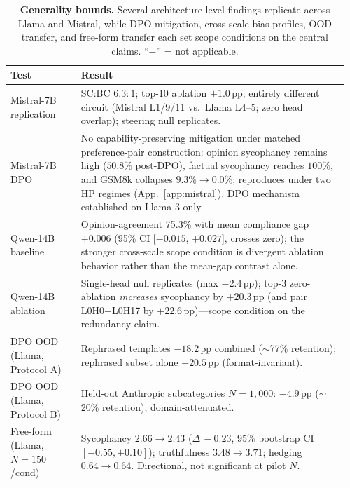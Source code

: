 \documentclass{article}
\begin{document}
\begin{table}[t]
\centering
\caption{\textbf{Generality bounds.} Several architecture-level findings replicate across Llama and Mistral, while DPO mitigation, cross-scale bias profiles, OOD transfer, and free-form transfer each set scope conditions on the central claims. ``$-$'' = not applicable.}
\label{tab:generality}
\footnotesize
\begin{tabular}{@{}>{\raggedright\arraybackslash}p{0.20\linewidth}>{\raggedright\arraybackslash}p{0.76\linewidth}@{}}
\toprule
\textbf{Test} & \textbf{Result} \\
\midrule
Mistral-7B replication & SC:BC $6.3{:}1$; top-10 ablation $+1.0$\,pp; entirely different circuit (Mistral L1/9/11 vs.\ Llama L4--5; zero head overlap); steering null replicates. \\[2pt]
Mistral-7B DPO & No capability-preserving mitigation under matched preference-pair construction: opinion sycophancy remains high ($50.8\%$ post-DPO), factual sycophancy reaches $100\%$, and GSM8k collapses $9.3\% \to 0.0\%$; reproduces under two HP regimes (App.~\ref{app:mistral}). DPO mechanism established on Llama-3 only. \\[2pt]
Qwen-14B baseline & Opinion-agreement 75.3\% with mean compliance gap $+0.006$ (95\% CI [$-0.015$, $+0.027$], crosses zero); the stronger cross-scale scope condition is divergent ablation behavior rather than the mean-gap contrast alone. \\[2pt]
Qwen-14B ablation & Single-head null replicates (max $-2.4$\,pp); top-3 zero-ablation \emph{increases} sycophancy by $+20.3$\,pp (and pair L0H0+L0H17 by $+22.6$\,pp)---scope condition on the redundancy claim. \\[2pt]
DPO OOD (Llama, Protocol A) & Rephrased templates $-18.2$\,pp combined ($\sim$77\% retention); rephrased subset alone $-20.5$\,pp (format-invariant). \\[2pt]
DPO OOD (Llama, Protocol B) & Held-out Anthropic subcategories $N{=}1{,}000$: $-4.9$\,pp ($\sim$20\% retention); domain-attenuated. \\[2pt]
Free-form (Llama, $N{=}150$/cond) & Sycophancy $2.66 \to 2.43$ ($\Delta\,{-}0.23$, 95\% bootstrap CI $[-0.55, +0.10]$); truthfulness $3.48 \to 3.71$; hedging $0.64 \to 0.64$. Directional, not significant at pilot $N$. \\
\bottomrule
\end{tabular}
\end{table}
\end{document}
